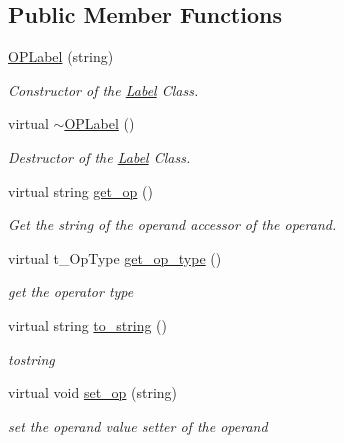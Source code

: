 \subsection*{Public Member Functions}
\begin{DoxyCompactItemize}
\item 
\mbox{\label{class_o_p_label_a5405b78894658047362a328e750f88b4}} 
\mbox{\hyperlink{class_o_p_label_a5405b78894658047362a328e750f88b4}{O\+P\+Label}} (string)
\begin{DoxyCompactList}\small\item\em Constructor of the \mbox{\hyperlink{class_label}{Label}} Class. \end{DoxyCompactList}\item 
\mbox{\label{class_o_p_label_ab25553d41606e880a622e09d5c09129d}} 
virtual \mbox{\hyperlink{class_o_p_label_ab25553d41606e880a622e09d5c09129d}{$\sim$\+O\+P\+Label}} ()
\begin{DoxyCompactList}\small\item\em Destructor of the \mbox{\hyperlink{class_label}{Label}} Class. \end{DoxyCompactList}\item 
\mbox{\label{class_o_p_label_a1c933d10a7b2267bae3bea6c385d466f}} 
virtual string \mbox{\hyperlink{class_o_p_label_a1c933d10a7b2267bae3bea6c385d466f}{get\+\_\+op}} ()
\begin{DoxyCompactList}\small\item\em Get the string of the operand accessor of the operand. \end{DoxyCompactList}\item 
virtual t\+\_\+\+Op\+Type \mbox{\hyperlink{class_o_p_label_a1a6ec701c549a6475d44ffcced1c23b5}{get\+\_\+op\+\_\+type}} ()
\begin{DoxyCompactList}\small\item\em get the operator type \end{DoxyCompactList}\item 
virtual string \mbox{\hyperlink{class_o_p_label_a51c4e8f45422f03edcb71d472cf5e973}{to\+\_\+string}} ()
\begin{DoxyCompactList}\small\item\em tostring \end{DoxyCompactList}\item 
\mbox{\label{class_o_p_label_a189bec8bcf7300e6e8656ce4bb443995}} 
virtual void \mbox{\hyperlink{class_o_p_label_a189bec8bcf7300e6e8656ce4bb443995}{set\+\_\+op}} (string)
\begin{DoxyCompactList}\small\item\em set the operand value setter of the operand \end{DoxyCompactList}\end{DoxyCompactItemize}
